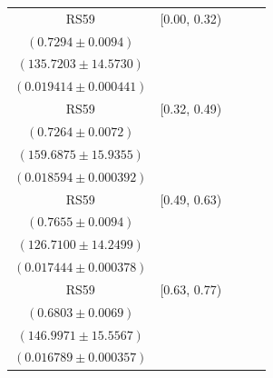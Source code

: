{\begin{longtable}{|c|c|c|c|c|}
\hline
RS59 & [0.00, 0.32) & \begin{tabular}{@{}c@{}}$0.7447 \pm 0.0083$ \\ $(0.7294 \pm 0.0094)$\end{tabular} & \begin{tabular}{@{}c@{}}$132.9470 \pm 14.2752$ \\ $(135.7203 \pm 14.5730)$\end{tabular} & \begin{tabular}{@{}c@{}}$0.016768 \pm 0.000765$ \\ $(0.019414 \pm 0.000441)$\end{tabular} \\ \hline
RS59 & [0.32, 0.49) & \begin{tabular}{@{}c@{}}$0.7072 \pm 0.0086$ \\ $(0.7264 \pm 0.0072)$\end{tabular} & \begin{tabular}{@{}c@{}}$164.0360 \pm 16.3694$ \\ $(159.6875 \pm 15.9355)$\end{tabular} & \begin{tabular}{@{}c@{}}$0.016532 \pm 0.000693$ \\ $(0.018594 \pm 0.000392)$\end{tabular} \\ \hline
RS59 & [0.49, 0.63) & \begin{tabular}{@{}c@{}}$0.7568 \pm 0.0085$ \\ $(0.7655 \pm 0.0094)$\end{tabular} & \begin{tabular}{@{}c@{}}$128.1719 \pm 14.4143$ \\ $(126.7100 \pm 14.2499)$\end{tabular} & \begin{tabular}{@{}c@{}}$0.015708 \pm 0.000672$ \\ $(0.017444 \pm 0.000378)$\end{tabular} \\ \hline
RS59 & [0.63, 0.77) & \begin{tabular}{@{}c@{}}$0.7044 \pm 0.0090$ \\ $(0.6803 \pm 0.0069)$\end{tabular} & \begin{tabular}{@{}c@{}}$141.9653 \pm 15.0242$ \\ $(146.9971 \pm 15.5567)$\end{tabular} & \begin{tabular}{@{}c@{}}$0.014024 \pm 0.000611$ \\ $(0.016789 \pm 0.000357)$\end{tabular} \\ \hline

\end{longtable}}
